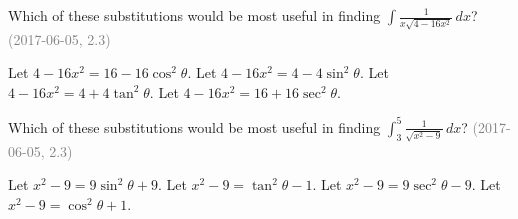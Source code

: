 \documentclass[12pt]{exam}
\newcommand{\questionDate}[1]{\textcolor{gray}{(#1)}}
\newcommand{\<}{\langle}
\renewcommand{\>}{\rangle}
\begin{document}
\begin{questions}
  \question
  Which of these substitutions would be most useful in finding
  \(\int\frac{1}{x\sqrt{4-16x^2}}\,dx\)?
  \questionDate{2017-06-05, 2.3}
  \begin{choices}
    \choice Let \(4-16x^2=16-16\cos^2\theta\).
    \CorrectChoice Let \(4-16x^2=4-4\sin^2\theta\).
    \choice Let \(4-16x^2=4+4\tan^2\theta\).
    \choice Let \(4-16x^2=16+16\sec^2\theta\).
  \end{choices}

  \question
  Which of these substitutions would be most useful in finding
  \(\int_3^5\frac{1}{\sqrt{x^2-9}}\,dx\)?
  \questionDate{2017-06-05, 2.3}
  \begin{choices}
    \choice Let \(x^2-9=9\sin^2\theta+9\).
    \choice Let \(x^2-9=\tan^2\theta-1\).
    \CorrectChoice Let \(x^2-9=9\sec^2\theta-9\).
    \choice Let \(x^2-9=\cos^2\theta+1\).
  \end{choices}








\end{questions}
\end{document}
